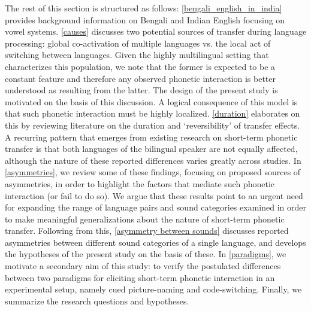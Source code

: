 
The rest of this section is structured as follows: \ref{bengali_english_in_india} provides background information on Bengali and Indian English focusing on vowel systems. \ref{causes} discusses two potential sources of transfer during language processing: global co-activation of multiple languages vs. the local act of switching between languages. Given the highly multilingual setting that characterizes this population, we note that the former is expected to be a constant feature and therefore any observed phonetic interaction is better understood as resulting from the latter. The design of the present study is motivated on the basis of this discussion. A logical consequence of this model is that such phonetic interaction must be highly localized. \ref{duration} elaborates on this by reviewing literature on the duration and `reversibility' of transfer effects. A recurring pattern that emerges from existing research on short-term phonetic transfer is that both languages of the bilingual speaker are not equally affected, although the nature of these reported differences varies greatly across studies. In \ref{asymmetries}, we review some of these findings, focusing on proposed sources of asymmetries, in order to highlight the factors that mediate such phonetic interaction (or fail to do so). We argue that these results point to an urgent need for expanding the range of language pairs and sound categories examined in order to make meaningful generalizations about the nature of short-term phonetic transfer. Following from this, \ref{asymmetry between sounds} discusses reported asymmetries between different sound categories of a single language, and develops the hypotheses of the present study on the basis of these. In \ref{paradigms}, we motivate a secondary aim of this study: to verify the postulated differences between two paradigms for eliciting short-term phonetic interaction in an experimental setup, namely cued picture-naming and code-switching. Finally, we summarize the research questions and hypotheses.



